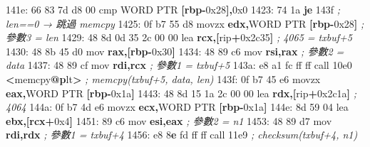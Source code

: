 \documentclass[10pt,a4paper]{article}
\newenvironment{Shaded}{\begin{snugshade}}{\end{snugshade}}
\newcommand{\BaseNTok}[1]{\textcolor[rgb]{0.00,0.00,0.81}{#1}}
\newcommand{\BuiltInTok}[1]{#1}
\newcommand{\CommentTok}[1]{\textcolor[rgb]{0.56,0.35,0.01}{\textit{#1}}}
\newcommand{\ControlFlowTok}[1]{\textcolor[rgb]{0.13,0.29,0.53}{\textbf{#1}}}
\newcommand{\DataTypeTok}[1]{\textcolor[rgb]{0.13,0.29,0.53}{#1}}
\newcommand{\DecValTok}[1]{\textcolor[rgb]{0.00,0.00,0.81}{#1}}
\newcommand{\ErrorTok}[1]{\textcolor[rgb]{0.64,0.00,0.00}{\textbf{#1}}}
\newcommand{\FloatTok}[1]{\textcolor[rgb]{0.00,0.00,0.81}{#1}}
\newcommand{\FunctionTok}[1]{\textcolor[rgb]{0.13,0.29,0.53}{\textbf{#1}}}
\newcommand{\KeywordTok}[1]{\textcolor[rgb]{0.13,0.29,0.53}{\textbf{#1}}}
\newcommand{\NormalTok}[1]{#1}
\newcommand{\OperatorTok}[1]{\textcolor[rgb]{0.81,0.36,0.00}{\textbf{#1}}}
\renewenvironment{Shaded}{%
  \def\FrameCommand{\fboxsep=3.2pt\colorbox{shadecolor}}%
  \MakeFramed{\advance\hsize-\width\FrameRestore\small}%
}{%
  \endMakeFramed
}
\begin{document}
\begin{Shaded}
\begin{Highlighting}[]
\NormalTok{141e: 66 83 7d d8 }\DecValTok{00}\NormalTok{         cmp    }\DataTypeTok{WORD} \DataTypeTok{PTR} \OperatorTok{[}\KeywordTok{rbp}\OperatorTok{{-}}\BaseNTok{0x28}\OperatorTok{],}\BaseNTok{0x0}
\NormalTok{1423: 74 1a                  }\ControlFlowTok{je}     \FloatTok{143}\BaseNTok{f}                  \CommentTok{; len==0 → 跳過 memcpy}
\NormalTok{1425: 0f b7 }\DecValTok{55}\NormalTok{ d8            movzx  }\KeywordTok{edx}\OperatorTok{,}\DataTypeTok{WORD} \DataTypeTok{PTR} \OperatorTok{[}\KeywordTok{rbp}\OperatorTok{{-}}\BaseNTok{0x28}\OperatorTok{]} \CommentTok{; 參數3 = len}
\NormalTok{1429: 48 8d 0d 35 2c 00 00   }\BuiltInTok{lea}    \KeywordTok{rcx}\OperatorTok{,[}\NormalTok{rip}\OperatorTok{+}\BaseNTok{0x2c35}\OperatorTok{]}     \CommentTok{; 4065 = txbuf+5}
\NormalTok{1430: 48 8b 45 d0            mov    }\KeywordTok{rax}\OperatorTok{,[}\KeywordTok{rbp}\OperatorTok{{-}}\BaseNTok{0x30}\OperatorTok{]}
\NormalTok{1434: 48 89 c6               mov    }\KeywordTok{rsi}\OperatorTok{,}\KeywordTok{rax}               \CommentTok{; 參數2 = data}
\NormalTok{1437: 48 89 cf               mov    }\KeywordTok{rdi}\OperatorTok{,}\KeywordTok{rcx}               \CommentTok{; 參數1 = txbuf+5}
\NormalTok{143a: e8 a1 fc ff ff         call   }\FloatTok{10e0} \OperatorTok{\textless{}}\NormalTok{memcpy}\FunctionTok{@}\ErrorTok{p}\NormalTok{lt}\OperatorTok{\textgreater{}}     \CommentTok{; memcpy(txbuf+5, data, len)}
\NormalTok{143f: 0f b7 }\DecValTok{45}\NormalTok{ e6            movzx  }\KeywordTok{eax}\OperatorTok{,}\DataTypeTok{WORD} \DataTypeTok{PTR} \OperatorTok{[}\KeywordTok{rbp}\OperatorTok{{-}}\BaseNTok{0x1a}\OperatorTok{]}
\NormalTok{1443: 48 8d 15 1a 2c 00 00   }\BuiltInTok{lea}    \KeywordTok{rdx}\OperatorTok{,[}\NormalTok{rip}\OperatorTok{+}\BaseNTok{0x2c1a}\OperatorTok{]}     \CommentTok{; 4064}
\NormalTok{144a: 0f b7 }\DecValTok{4}\BaseNTok{d}\NormalTok{ e6            movzx  }\KeywordTok{ecx}\OperatorTok{,}\DataTypeTok{WORD} \DataTypeTok{PTR} \OperatorTok{[}\KeywordTok{rbp}\OperatorTok{{-}}\BaseNTok{0x1a}\OperatorTok{]}
\NormalTok{144e: 8d 59 04               }\BuiltInTok{lea}    \KeywordTok{ebx}\OperatorTok{,[}\KeywordTok{rcx}\OperatorTok{+}\BaseNTok{0x4}\OperatorTok{]}
\NormalTok{1451: 89 c6                  mov    }\KeywordTok{esi}\OperatorTok{,}\KeywordTok{eax}               \CommentTok{; 參數2 = n1}
\NormalTok{1453: 48 89 d7               mov    }\KeywordTok{rdi}\OperatorTok{,}\KeywordTok{rdx}               \CommentTok{; 參數1 = txbuf+4}
\NormalTok{1456: e8 }\DecValTok{8}\ErrorTok{e}\NormalTok{ fd ff ff         call   }\FloatTok{11e9}                 \CommentTok{; checksum(txbuf+4, n1)}

\end{Highlighting}
\end{Shaded}
\end{document}
